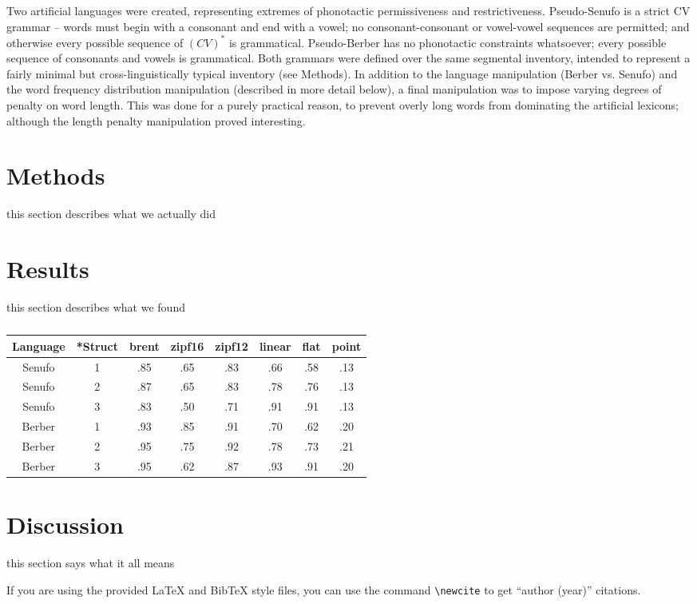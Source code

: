 \documentclass[11pt]{article}
\begin{document}
Two artificial languages were created, representing extremes of phonotactic permissiveness and restrictiveness. Pseudo-Senufo is a strict CV grammar -- words must begin with a consonant and end with a vowel; no consonant-consonant or vowel-vowel sequences are permitted; and otherwise every possible sequence of $(CV)^*$ is grammatical. Pseudo-Berber has no phonotactic constraints whatsoever; every possible sequence of consonants and vowels is grammatical. Both grammars were defined over the same segmental inventory, intended to represent a fairly minimal but cross-linguistically typical inventory (see Methods). In addition to the language manipulation (Berber vs. Senufo) and the word frequency distribution manipulation (described in more detail below), a final manipulation was to impose varying degrees of penalty on word length. This was done for a purely practical reason, to prevent overly long words from dominating the artificial lexicons; although the length penalty manipulation proved interesting.



\section{Methods}

this section describes what we actually did

\section{Results}

this section describes what we found

\begin{table}[h]
\begin{center}
\begin{tabular}{|c||c|cccccc|}
  \hline
  Language & *Struct & brent & zipf16 & zipf12 & linear & flat & point \\
  \hline
  Senufo & 1 & .85 & .65 & .83 & .66 & .58 & .13 \\
  Senufo & 2 & .87 & .65 & .83 & .78 & .76 & .13 \\
  Senufo & 3 & .83 & .50 & .71 & .91 & .91 & .13 \\
  \hline
  Berber & 1 & .93 & .85 & .91 & .70 & .62 & .20 \\
  Berber & 2 & .95 & .75 & .92 & .78 & .73 & .21 \\
  Berber & 3 & .95 & .62 & .87 & .93 & .91 & .20 \\
  \hline
\end{tabular}
\end{center}
\caption{\label{Results.}}
\end{table}

\section{Discussion}

this section says what it all means

If you are using the provided \LaTeX{} and Bib\TeX{} style files, you
can use the command \verb|\newcite| to get ``author (year)'' citations.




\end{document}
